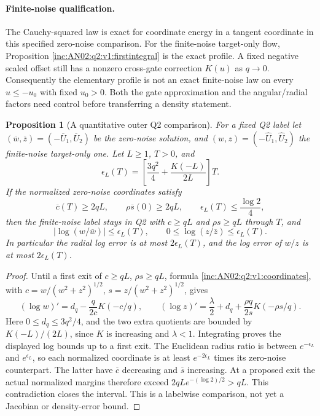 \documentclass[11pt]{article}
\numberwithin{equation}{section}
\newtheorem{proposition}[theorem]{Proposition}\newtheorem{corollary}[theorem]{Corollary}
\theoremstyle{remark}\newtheorem{remark}[theorem]{Remark}
\begin{document}
\paragraph{Finite-noise qualification.}
The Cauchy-squared law is exact for coordinate energy in a tangent
coordinate in this specified zero-noise comparison. For the finite-noise
target-only flow, Proposition \ref{inc:AN02:q2:v1:firstintegral} is the
exact profile. A fixed negative scaled offset still has a nonzero
cross-gate correction $K(u)$ as $q\to0$. Consequently the elementary
profile is not an exact finite-noise law on every $u\le-u_0$ with fixed
$u_0>0$. Both the gate approximation and the angular/radial factors need
control before transferring a density statement.

\begin{proposition}[A quantitative outer Q2 comparison]
\label{inc:AN02:q2:v1:outer}
For a fixed Q2 label let $(\overline w,\overline z)
=(-\overline U_1,\overline U_2)$ be the zero-noise solution, and
$(w,z)=(-\widehat U_1,\widehat U_2)$ the finite-noise target-only one.
Let $L\ge1$, $T>0$, and
\[
 \epsilon_L(T)=\left[\frac{3q^2}{4}+\frac{K(-L)}{2L}\right]T.
\]
If the normalized zero-noise coordinates satisfy
\[
 \overline c(T)\ge2qL,\qquad \rho\overline s(0)\ge2qL,
 \qquad \epsilon_L(T)\le\frac{\log2}{4},
\]
then the finite-noise label stays in Q2 with $c\ge qL$ and
$\rho s\ge qL$ through $T$, and
\[
 |\log(w/\overline w)|\le\epsilon_L(T),\qquad
 0\le\log(z/\overline z)\le\epsilon_L(T).
\]
In particular the radial log error is at most $2\epsilon_L(T)$,
and the log error of $w/z$ is at most $2\epsilon_L(T)$.
\end{proposition}
\begin{proof}
Until a first exit of $c\ge qL$, $\rho s\ge qL$, formula
\eqref{inc:AN02:q2:v1:coordinates}, with $c=w/(w^2+z^2)^{1/2}$,
$s=z/(w^2+z^2)^{1/2}$, gives
\[
 (\log w)'=d_q-\frac{q}{2c}K(-c/q),\qquad
 (\log z)'=\frac\lambda2+d_q+\frac{\rho q}{2s}K(-\rho s/q).
\]
Here $0\le d_q\le3q^2/4$, and the two extra quotients are bounded
by $K(-L)/(2L)$, since $K$ is increasing and $\lambda<1$.
Integrating proves the displayed log bounds up to a first exit.
The Euclidean radius ratio is between $e^{-\epsilon_L}$ and
$e^{\epsilon_L}$, so each normalized coordinate is at least
$e^{-2\epsilon_L}$ times its zero-noise counterpart.
The latter have $\overline c$ decreasing and $\overline s$ increasing.
At a proposed exit the actual normalized margins therefore exceed
$2qL e^{-(\log2)/2}>qL$. This contradiction closes the interval.
This is a labelwise comparison, not yet a Jacobian or density-error bound.
\end{proof}
\end{document}
